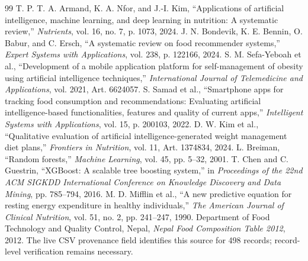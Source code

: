 \documentclass[12pt,a4paper]{report}
\begin{document}
\begin{thebibliography}{99}
 T. P. T. A. Armand, K. A. Nfor, and J.-I. Kim,
``Applications of artificial intelligence, machine learning, and deep learning in
nutrition: A systematic review,'' \emph{Nutrients}, vol. 16, no. 7, p. 1073, 2024.
 J. N. Bondevik, K. E. Bennin, O. Babur, and C. Ersch,
``A systematic review on food recommender systems,'' \emph{Expert Systems with
Applications}, vol. 238, p. 122166, 2024.
 S. M. Sefa-Yeboah et al., ``Development of a mobile application
platform for self-management of obesity using artificial intelligence techniques,''
\emph{International Journal of Telemedicine and Applications}, vol. 2021,
Art. 6624057.
 S. Samad et al., ``Smartphone apps for tracking food consumption
and recommendations: Evaluating artificial intelligence-based functionalities,
features and quality of current apps,'' \emph{Intelligent Systems with Applications},
vol. 15, p. 200103, 2022.
 D. W. Kim et al., ``Qualitative evaluation of artificial
intelligence-generated weight management diet plans,'' \emph{Frontiers in Nutrition},
vol. 11, Art. 1374834, 2024.
 L. Breiman, ``Random forests,'' \emph{Machine Learning},
vol. 45, pp. 5--32, 2001.
 T. Chen and C. Guestrin, ``XGBoost: A scalable tree boosting
system,'' in \emph{Proceedings of the 22nd ACM SIGKDD International Conference on
Knowledge Discovery and Data Mining}, pp. 785--794, 2016.
 M. D. Mifflin et al., ``A new predictive equation for resting
energy expenditure in healthy individuals,'' \emph{The American Journal of Clinical
Nutrition}, vol. 51, no. 2, pp. 241--247, 1990.
 Department of Food Technology and Quality Control, Nepal,
\emph{Nepal Food Composition Table 2012}, 2012. The live CSV provenance field
identifies this source for 498 records; record-level verification remains necessary.
\end{thebibliography}
\end{document}
